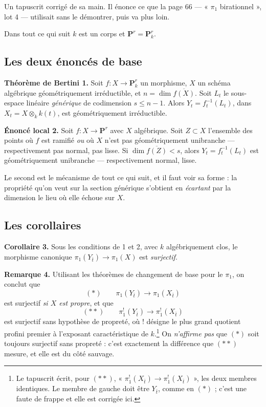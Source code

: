\documentclass[11pt,a4paper]{article}
\begin{document}
Un tapuscrit corrigé de sa main. Il énonce ce que la page 66 --- « $\pi_{1}$
birationnel », lot 4 --- utilisait sans le démontrer, puis va plus loin.

Dans tout ce qui suit $k$ est un corps et $\mathbf{P}^{r} = \mathbf{P}^{r}_{k}$.

\subsection*{Les deux énoncés de base}

\textbf{Théorème de Bertini 1.} Soit $f : X \to \mathbf{P}^{r}_{k}$ un
morphisme, $X$ un schéma algébrique géométriquement irréductible, et
$n = \dim \overline{f(X)}$. Soit $L_{t}$ le sous-espace linéaire
\emph{générique} de codimension $s \leqslant n-1$. Alors
$Y_{t} = f_{t}^{-1}(L_{t})$, dans $X_{t} = X \otimes_{k} k(t)$, est
géométriquement irréductible.

\textbf{Énoncé local 2.} Soit $f : X \to \mathbf{P}^{r}$ avec $X$ algébrique.
Soit $Z \subset X$ l'ensemble des points où $f$ est ramifié \emph{ou} où $X$
n'est pas géométriquement unibranche --- respectivement pas normal, pas lisse.
Si $\dim \overline{f(Z)} < s$, alors $Y_{t} = f_{t}^{-1}(L_{t})$ est
géométriquement unibranche --- respectivement normal, lisse.

Le second est le mécanisme de tout ce qui suit, et il faut voir sa forme : la
propriété qu'on veut sur la section générique s'obtient en \emph{écartant} par
la dimension le lieu où elle échoue sur $X$.

\subsection*{Les corollaires}

\textbf{Corollaire 3.} Sous les conditions de 1 et 2, avec $k$ algébriquement
clos, le morphisme canonique $\pi_{1}(Y_{\bar{t}}) \to \pi_{1}(X)$ est
\emph{surjectif}.

\textbf{Remarque 4.} Utilisant les théorèmes de changement de base pour le
$\pi_{1}$, on conclut que
\[
  (\ast) \qquad \pi_{1}(Y_{\bar{t}}) \longrightarrow \pi_{1}(X_{\bar{t}})
\]
est surjectif \emph{si $X$ est propre}, et que
\[
  (\ast\ast) \qquad \pi_{1}^{!}(Y_{\bar{t}}) \longrightarrow
  \pi_{1}^{!}(X_{\bar{t}})
\]
est surjectif sans hypothèse de propreté, où $!$ désigne le plus grand quotient
profini premier à l'exposant caractéristique de $k$.\footnote{Le tapuscrit
écrit, pour $(\ast\ast)$, « $\pi_{1}^{!}(X_{\bar{t}}) \to
\pi_{1}^{!}(X_{\bar{t}})$ », les deux membres identiques. Le membre de gauche
doit être $Y_{\bar{t}}$, comme en $(\ast)$ ; c'est une faute de frappe et elle
est corrigée ici.} On \emph{n'affirme pas} que $(\ast)$ soit toujours surjectif
sans propreté : c'est exactement la différence que $(\ast\ast)$ mesure, et elle
est du côté sauvage.
\end{document}
